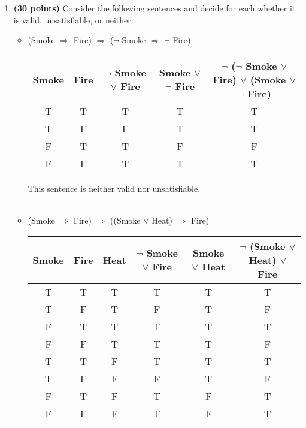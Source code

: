 \documentclass[12pt]{article}
\begin{document}
\begin{enumerate}
	\item \textbf{(30 points)} Consider the following sentences and decide for each whether it is valid, unsatisfiable, or neither:

	\begin{itemize}
		\item (Smoke $\Rightarrow$ Fire) $\Rightarrow$ ($\neg$ Smoke $\Rightarrow$ $\neg$ Fire)

		\begin{table}[!ht]
			\centering
			\begin{tabular}{| c | c || c | c | c |}
				\hline
				Smoke & Fire & $\neg$ Smoke $\lor$ Fire & Smoke $\lor$ $\neg$ Fire & $\neg$ ($\neg$ Smoke $\lor$ Fire) $\lor$ (Smoke $\lor$ $\neg$ Fire) \\
				\hline
				T & T & T & T & T \\
				T & F & F & T & T \\
				F & T & T & F & F \\
				F & F & T & T & T \\
				\hline
			\end{tabular}
		\end{table}

		This sentence is neither valid nor unsatisfiable. \\\\

		\item (Smoke $\Rightarrow$ Fire) $\Rightarrow$ ((Smoke $\lor$ Heat) $\Rightarrow$ Fire)

		\begin{table}[!ht]
			\centering
			\begin{tabular}{| c | c | c || c | c | c |}
				\hline
				Smoke & Fire & Heat & $\neg$ Smoke $\lor$ Fire & Smoke $\lor$ Heat & $\neg$ (Smoke $\lor$ Heat) $\lor$ Fire \\
				\hline
				T & T & T & T & T & T \\
				T & F & T & F & T & F \\
				F & T & T & T & T & T \\
				F & F & T & T & T & F \\
				T & T & F & T & T & T \\
				T & F & F & F & T & F \\
				F & T & F & T & F & T \\
				F & F & F & T & F & T \\
				\hline
			\end{tabular}
			\vspace*{-0.2in}
		\end{table}


\end{itemize}
\end{enumerate}
\end{document}
